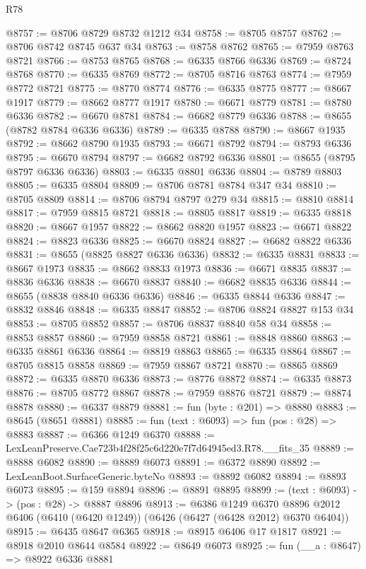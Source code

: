 \begin{lexlean}{R78}
\begin{coremodule}
@8757 := @8706 @8729 @8732 @1212 @34
@8758 := @8705 @8757
@8762 := @8706 @8742 @8745 @637 @34
@8763 := @8758 @8762
@8765 := @7959 @8763 @8721
@8766 := @8753 @8765
@8768 := @6335 @8766 @6336
@8769 := @8724 @8768
@8770 := @6335 @8769
@8772 := @8705 @8716 @8763
@8774 := @7959 @8772 @8721
@8775 := @8770 @8774
@8776 := @6335 @8775
@8777 := @8667 @1917
@8779 := @8662 @8777 @1917
@8780 := @6671 @8779
@8781 := @8780 @6336
@8782 := @6670 @8781
@8784 := @6682 @8779 @6336
@8788 := @8655 (@8782 @8784 @6336 @6336)
@8789 := @6335 @8788
@8790 := @8667 @1935
@8792 := @8662 @8790 @1935
@8793 := @6671 @8792
@8794 := @8793 @6336
@8795 := @6670 @8794
@8797 := @6682 @8792 @6336
@8801 := @8655 (@8795 @8797 @6336 @6336)
@8803 := @6335 @8801 @6336
@8804 := @8789 @8803
@8805 := @6335 @8804
@8809 := @8706 @8781 @8784 @347 @34
@8810 := @8705 @8809
@8814 := @8706 @8794 @8797 @279 @34
@8815 := @8810 @8814
@8817 := @7959 @8815 @8721
@8818 := @8805 @8817
@8819 := @6335 @8818
@8820 := @8667 @1957
@8822 := @8662 @8820 @1957
@8823 := @6671 @8822
@8824 := @8823 @6336
@8825 := @6670 @8824
@8827 := @6682 @8822 @6336
@8831 := @8655 (@8825 @8827 @6336 @6336)
@8832 := @6335 @8831
@8833 := @8667 @1973
@8835 := @8662 @8833 @1973
@8836 := @6671 @8835
@8837 := @8836 @6336
@8838 := @6670 @8837
@8840 := @6682 @8835 @6336
@8844 := @8655 (@8838 @8840 @6336 @6336)
@8846 := @6335 @8844 @6336
@8847 := @8832 @8846
@8848 := @6335 @8847
@8852 := @8706 @8824 @8827 @153 @34
@8853 := @8705 @8852
@8857 := @8706 @8837 @8840 @58 @34
@8858 := @8853 @8857
@8860 := @7959 @8858 @8721
@8861 := @8848 @8860
@8863 := @6335 @8861 @6336
@8864 := @8819 @8863
@8865 := @6335 @8864
@8867 := @8705 @8815 @8858
@8869 := @7959 @8867 @8721
@8870 := @8865 @8869
@8872 := @6335 @8870 @6336
@8873 := @8776 @8872
@8874 := @6335 @8873
@8876 := @8705 @8772 @8867
@8878 := @7959 @8876 @8721
@8879 := @8874 @8878
@8880 := @6337 @8879
@8881 := fun (byte : @201) => @8880
@8883 := @8645 (@8651 @8881)
@8885 := fun (text : @6093) => fun (pos : @28) => @8883
@8887 := @6366 @1249 @6370
@8888 := LexLeanPreserve.Cae723b4f28f25c6d220e7f7d64945ed3.R78.__fits_35
@8889 := @8888 @6082
@8890 := @8889 @6073
@8891 := @6372 @8890
@8892 := LexLeanBoot.SurfaceGeneric.byteNo
@8893 := @8892 @6082
@8894 := @8893 @6073
@8895 := @159 @8894
@8896 := @8891 @8895
@8899 := (text : @6093) -> (pos : @28) -> @8887 @8896
@8913 := @6386
    @1249
    @6370
    @8896
    @2012
    @6406
    (@6410 (@6420 @1249))
    (@6426 (@6427 (@6428 @2012) @6370 @6404))
@8915 := @6435 @8647 @6365
@8918 := @8915 @6406 @17 @1817
@8921 := @8918 @2010 @8644 @8584
@8922 := @8649 @6073
@8925 := fun (__a : @8647) => @8922 @6336 @8881

\end{coremodule}
\end{lexlean}
